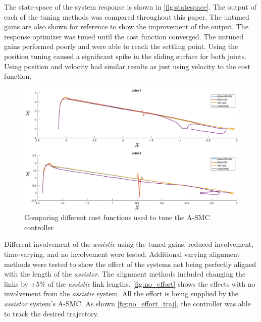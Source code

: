 The state-space of the system response is shown in  \autoref{fig:statespace}. The output of each of the tuning methods was compared throughout this paper. The untuned gains are also shown for reference to show the improvement of the output. The response optimizer was tuned until the cost function converged. The untuned gains performed poorly and were able to reach the settling point. Using the position tuning caused a significant spike in the sliding surface for both joints. Using position and velocity had similar results as just using velocity to the cost function. 


\begin{figure}[ht!]
    \centering
    \includegraphics[width=\linewidth]{images/controllers/statespace.eps}
    \caption[A-SMC State Space]{Comparing different cost functions used to tune the A-SMC controller}
    \label{fig:statespace}
\end{figure}

Different involvement of the \textit{assistie}  using the tuned gains, reduced involvement, time-varying, and no involvement were tested. Additional varying alignment methods were tested to show the effect of the systems not being perfectly aligned with the length of the \textit{assistor}. The alignment methods included changing the links by $\pm 5\%$ of the \textit{assistie} link lengths. \autoref{fig:no_effort} shows the effects with no involvement from the \textit{assistie} system. All the effort is being supplied by the \textit{assistor} system's A-SMC. As shown \autoref{fig:no_effort_traj}, the controller was able to track the desired trajectory. 

